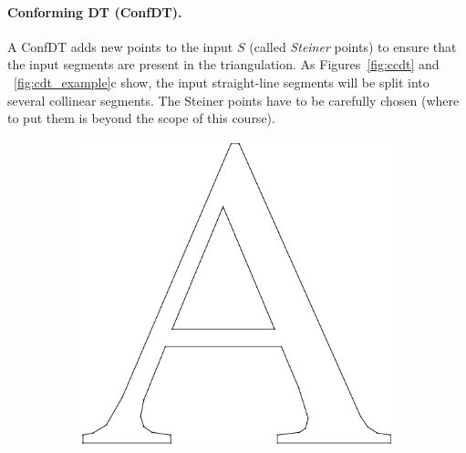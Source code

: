\paragraph*{Conforming DT (ConfDT).}
A ConfDT adds new points to the input $S$ (called \emph{Steiner} points) to ensure that the input segments are present in the triangulation. 
As Figures~\ref{fig:ccdt} and ~\ref{fig:cdt_example}c show, the input straight-line segments will be split into several collinear segments. 
The Steiner points have to be carefully chosen (where to put them is beyond the scope of this course).
\begin{figure}
  \centering
  \begin{subfigure}[b]{0.3\linewidth}
    \includegraphics[width=\textwidth]{figs/cdt_input.pdf}
    \caption{}
  \end{subfigure}%
  \qquad
  \begin{subfigure}[b]{0.3\linewidth}

\end{subfigure}
\end{figure}

